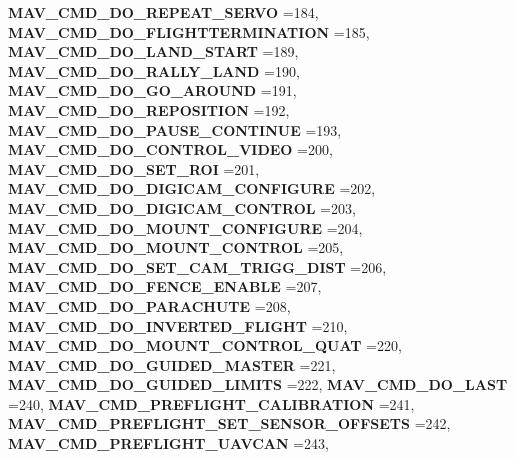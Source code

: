 \begin{DoxyCompactItemize}
\newline
\textbf{ M\+A\+V\+\_\+\+C\+M\+D\+\_\+\+D\+O\+\_\+\+R\+E\+P\+E\+A\+T\+\_\+\+S\+E\+R\+VO} =184, 
\textbf{ M\+A\+V\+\_\+\+C\+M\+D\+\_\+\+D\+O\+\_\+\+F\+L\+I\+G\+H\+T\+T\+E\+R\+M\+I\+N\+A\+T\+I\+ON} =185, 
\textbf{ M\+A\+V\+\_\+\+C\+M\+D\+\_\+\+D\+O\+\_\+\+L\+A\+N\+D\+\_\+\+S\+T\+A\+RT} =189, 
\textbf{ M\+A\+V\+\_\+\+C\+M\+D\+\_\+\+D\+O\+\_\+\+R\+A\+L\+L\+Y\+\_\+\+L\+A\+ND} =190, 
\newline
\textbf{ M\+A\+V\+\_\+\+C\+M\+D\+\_\+\+D\+O\+\_\+\+G\+O\+\_\+\+A\+R\+O\+U\+ND} =191, 
\textbf{ M\+A\+V\+\_\+\+C\+M\+D\+\_\+\+D\+O\+\_\+\+R\+E\+P\+O\+S\+I\+T\+I\+ON} =192, 
\textbf{ M\+A\+V\+\_\+\+C\+M\+D\+\_\+\+D\+O\+\_\+\+P\+A\+U\+S\+E\+\_\+\+C\+O\+N\+T\+I\+N\+UE} =193, 
\textbf{ M\+A\+V\+\_\+\+C\+M\+D\+\_\+\+D\+O\+\_\+\+C\+O\+N\+T\+R\+O\+L\+\_\+\+V\+I\+D\+EO} =200, 
\newline
\textbf{ M\+A\+V\+\_\+\+C\+M\+D\+\_\+\+D\+O\+\_\+\+S\+E\+T\+\_\+\+R\+OI} =201, 
\textbf{ M\+A\+V\+\_\+\+C\+M\+D\+\_\+\+D\+O\+\_\+\+D\+I\+G\+I\+C\+A\+M\+\_\+\+C\+O\+N\+F\+I\+G\+U\+RE} =202, 
\textbf{ M\+A\+V\+\_\+\+C\+M\+D\+\_\+\+D\+O\+\_\+\+D\+I\+G\+I\+C\+A\+M\+\_\+\+C\+O\+N\+T\+R\+OL} =203, 
\textbf{ M\+A\+V\+\_\+\+C\+M\+D\+\_\+\+D\+O\+\_\+\+M\+O\+U\+N\+T\+\_\+\+C\+O\+N\+F\+I\+G\+U\+RE} =204, 
\newline
\textbf{ M\+A\+V\+\_\+\+C\+M\+D\+\_\+\+D\+O\+\_\+\+M\+O\+U\+N\+T\+\_\+\+C\+O\+N\+T\+R\+OL} =205, 
\textbf{ M\+A\+V\+\_\+\+C\+M\+D\+\_\+\+D\+O\+\_\+\+S\+E\+T\+\_\+\+C\+A\+M\+\_\+\+T\+R\+I\+G\+G\+\_\+\+D\+I\+ST} =206, 
\textbf{ M\+A\+V\+\_\+\+C\+M\+D\+\_\+\+D\+O\+\_\+\+F\+E\+N\+C\+E\+\_\+\+E\+N\+A\+B\+LE} =207, 
\textbf{ M\+A\+V\+\_\+\+C\+M\+D\+\_\+\+D\+O\+\_\+\+P\+A\+R\+A\+C\+H\+U\+TE} =208, 
\newline
\textbf{ M\+A\+V\+\_\+\+C\+M\+D\+\_\+\+D\+O\+\_\+\+I\+N\+V\+E\+R\+T\+E\+D\+\_\+\+F\+L\+I\+G\+HT} =210, 
\textbf{ M\+A\+V\+\_\+\+C\+M\+D\+\_\+\+D\+O\+\_\+\+M\+O\+U\+N\+T\+\_\+\+C\+O\+N\+T\+R\+O\+L\+\_\+\+Q\+U\+AT} =220, 
\textbf{ M\+A\+V\+\_\+\+C\+M\+D\+\_\+\+D\+O\+\_\+\+G\+U\+I\+D\+E\+D\+\_\+\+M\+A\+S\+T\+ER} =221, 
\textbf{ M\+A\+V\+\_\+\+C\+M\+D\+\_\+\+D\+O\+\_\+\+G\+U\+I\+D\+E\+D\+\_\+\+L\+I\+M\+I\+TS} =222, 
\newline
\textbf{ M\+A\+V\+\_\+\+C\+M\+D\+\_\+\+D\+O\+\_\+\+L\+A\+ST} =240, 
\textbf{ M\+A\+V\+\_\+\+C\+M\+D\+\_\+\+P\+R\+E\+F\+L\+I\+G\+H\+T\+\_\+\+C\+A\+L\+I\+B\+R\+A\+T\+I\+ON} =241, 
\textbf{ M\+A\+V\+\_\+\+C\+M\+D\+\_\+\+P\+R\+E\+F\+L\+I\+G\+H\+T\+\_\+\+S\+E\+T\+\_\+\+S\+E\+N\+S\+O\+R\+\_\+\+O\+F\+F\+S\+E\+TS} =242, 
\textbf{ M\+A\+V\+\_\+\+C\+M\+D\+\_\+\+P\+R\+E\+F\+L\+I\+G\+H\+T\+\_\+\+U\+A\+V\+C\+AN} =243, 

\end{DoxyCompactItemize}
